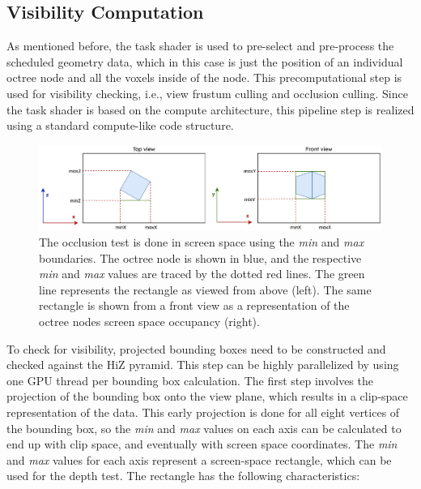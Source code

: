\subsection*{Visibility Computation} \label{subsec-visibility-computation}

As mentioned before, the task shader is used to pre-select and pre-process the scheduled geometry data, 
which in this case is just the position of an individual octree node and all the voxels inside of the node. 
This precomputational step is used for visibility checking, i.e., view frustum culling and occlusion culling. 
Since the task shader is based on the compute architecture, this pipeline step is realized using a standard 
compute-like code structure. \\

\begin{figure}[htbp]
    \centering
    \includegraphics[width=\linewidth]{images/graphics/screen_space_occlusion_test.jpg}
    \caption{The occlusion test is done in screen space using the \emph{min} and \emph{max} boundaries. The octree node 
    is shown in blue, and the respective \emph{min} and \emph{max} values are traced by the dotted red lines. The green 
    line represents the rectangle as viewed from above (left). The same rectangle is shown from a front view as a 
    representation of the octree nodes screen space occupancy (right).}
    \label{fig:screen-space-occlusion-test}
\end{figure}

\noindent
To check for visibility, projected bounding boxes need to be constructed and checked against the 
\ac{HiZ} pyramid. This step can be highly parallelized by using one \ac{GPU} thread per bounding box 
calculation. The first step involves the projection of the bounding box onto the view plane, which results 
in a clip-space representation of the data. This early projection is done for all eight vertices of the 
bounding box, so the \emph{min} and \emph{max} values on each axis can be calculated to end up with clip space, 
and eventually with screen space coordinates. The \emph{min} and \emph{max} values for each axis represent 
a screen-space rectangle, which can be used for the depth test. The rectangle has the following characteristics:

